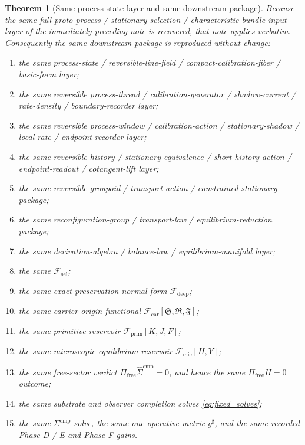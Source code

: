 \documentclass[11pt]{article}
\newcommand{\CompletedMetric}{g^{\sharp}}
\newcommand{\CompLift}{\widehat\Sigma^{\mathrm{cmp}}}
\newcommand{\FreeProj}{\Pi_{\mathrm{free}}}
\newcommand{\GaugeAux}{Y}
\newcommand{\MicFunctional}{\mathscr F_{\mathrm{mic}}}
\newcommand{\PrimFunctional}{\mathscr F_{\mathrm{prim}}}
\newcommand{\CarrierFunctional}{\mathscr F_{\mathrm{car}}}
\newcommand{\DeepFunctional}{\mathscr F_{\mathrm{deep}}}
\newcommand{\StemFunctional}{\mathscr F_{\mathrm{sel}}}
\newcommand{\PrimStrain}{K}
\newcommand{\PrimNeutral}{J}
\newcommand{\PrimFree}{F}
\newcommand{\CarrierSeed}{\mathfrak S}
\newcommand{\RelabelSeed}{\mathfrak R}
\newcommand{\FreeSeed}{\mathfrak F}
\newtheorem{theorem}{Theorem}
\begin{document}
\begin{theorem}[Same process-state layer and same downstream package]
\label{thm:same_package}
Because the same full proto-process / stationary-selection / characteristic-bundle input layer of the immediately preceding note is recovered, that note applies verbatim. Consequently the same downstream package is reproduced without change:
\begin{enumerate}
    \item the same process-state / reversible-line-field / compact-calibration-fiber / basic-form layer;
    \item the same reversible process-thread / calibration-generator / shadow-current / rate-density / boundary-recorder layer;
    \item the same reversible process-window / calibration-action / stationary-shadow / local-rate / endpoint-recorder layer;
    \item the same reversible-history / stationary-equivalence / short-history-action / endpoint-readout / cotangent-lift layer;
    \item the same reversible-groupoid / transport-action / constrained-stationary package;
    \item the same reconfiguration-group / transport-law / equilibrium-reduction package;
    \item the same derivation-algebra / balance-law / equilibrium-manifold layer;
    \item the same \(\StemFunctional\);
    \item the same exact-preservation normal form \(\DeepFunctional\);
    \item the same carrier-origin functional \(\CarrierFunctional[\CarrierSeed,\RelabelSeed,\FreeSeed]\);
    \item the same primitive reservoir \(\PrimFunctional[\PrimStrain,\PrimNeutral,\PrimFree]\);
    \item the same microscopic-equilibrium reservoir \(\MicFunctional[H,\GaugeAux]\);
    \item the same free-sector verdict \(\FreeProj\CompLift=0\), and hence the same \(\Pi_{\mathrm{free}}H=0\) outcome;
    \item the same substrate and observer completion solves \eqref{eq:fixed_solves};
    \item the same \(\Sigma^{\mathrm{cmp}}\) solve, the same one operative metric \(\CompletedMetric\), and the same recorded Phase D / E and Phase F gains.
\end{enumerate}
\end{theorem}
\end{document}
